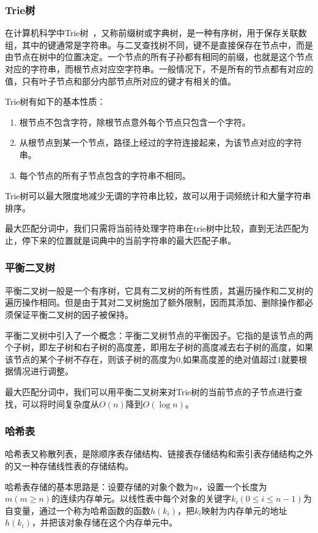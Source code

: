 \documentclass[11pt,a4paper]{article}
\begin{document}
	\subsubsection{Trie树}
	在计算机科学中Trie树~\citep{thue1912uber}，又称前缀树或字典树，是一种有序树，用于保存关联数组，其中的键通常是字符串。与二叉查找树不同，键不是直接保存在节点中，而是由节点在树中的位置决定。一个节点的所有子孙都有相同的前缀，也就是这个节点对应的字符串，而根节点对应空字符串。一般情况下，不是所有的节点都有对应的值，只有叶子节点和部分内部节点所对应的键才有相关的值。
	
	Trie树有如下的基本性质：
	\begin{enumerate}
		\item 根节点不包含字符，除根节点意外每个节点只包含一个字符。
		\item 从根节点到某一个节点，路径上经过的字符连接起来，为该节点对应的字符串。
		\item 每个节点的所有子节点包含的字符串不相同。
	\end{enumerate}
	
	Trie树可以最大限度地减少无谓的字符串比较，故可以用于词频统计和大量字符串排序。
	
	最大匹配分词中，我们只需将当前待处理字符串在trie树中比较，直到无法匹配为止，停下来的位置就是词典中的当前字符串的最大匹配子串。
	
	\subsubsection{平衡二叉树}
	平衡二叉树一般是一个有序树，它具有二叉树的所有性质，其遍历操作和二叉树的遍历操作相同。但是由于其对二叉树施加了额外限制，因而其添加、删除操作都必须保证平衡二叉树的因子被保持。
	
	平衡二叉树中引入了一个概念：平衡二叉树节点的平衡因子。它指的是该节点的两个子树，即左子树和右子树的高度差，即用左子树的高度减去右子树的高度，如果该节点的某个子树不存在，则该子树的高度为$0$,如果高度差的绝对值超过$1$就要根据情况进行调整。
	
	最大匹配分词中，我们可以用平衡二叉树来对Trie树的当前节点的子节点进行查找，可以将时间复杂度从$O(n)$降到$O(\log n)$。
	
	\subsubsection{哈希表}
	
	哈希表又称散列表，是除顺序表存储结构、链接表存储结构和索引表存储结构之外的又一种存储线性表的存储结构。
	
	哈希表存储的基本思路是：设要存储的对象个数为$n$，设置一个长度为$m(m\geq n)$的连续内存单元。以线性表中每个对象的关键字$k_i(0\leq i\leq n-1)$为自变量，通过一个称为哈希函数的函数$h(k_i)$，把$k_i$映射为内存单元的地址$h(k_i)$，并把该对象存储在这个内存单元中。
	
\end{document}
